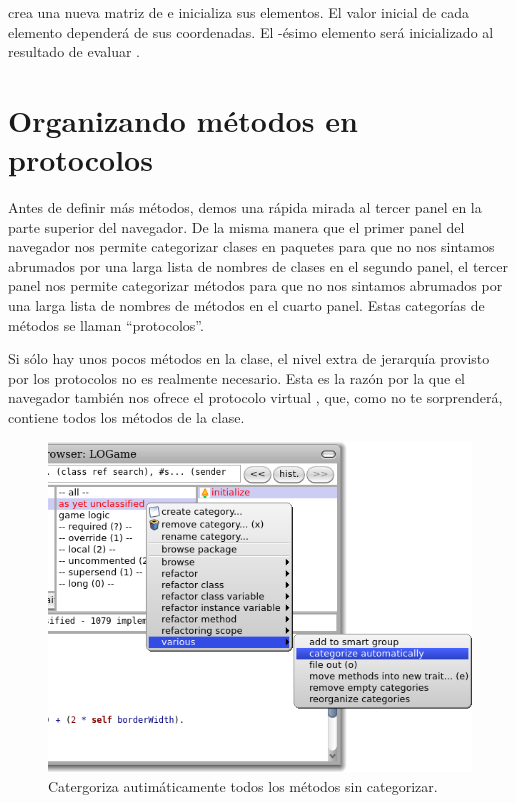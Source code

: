 \documentclass[a4paper,10pt,twoside]{book}
\begin{document}

 crea una nueva matriz de  e inicializa sus elementos. El valor inicial de cada elemento depender\'a de sus coordenadas.  El -\'esimo elemento ser\'a inicializado al resultado de evaluar .


\section{Organizando m\'etodos en protocolos}

Antes de definir m\'as m\'etodos, demos una r\'apida mirada al tercer panel en la parte superior del navegador. 
De la misma manera que el primer panel del navegador nos permite categorizar clases en paquetes para que no nos sintamos abrumados por una larga lista de nombres de clases en el segundo panel, el tercer panel nos permite categorizar m\'etodos para que no nos sintamos abrumados por una larga lista de nombres de m\'etodos en el cuarto panel.
Estas categor\'ias de m\'etodos se llaman ``protocolos''.

Si s\'olo hay unos pocos m\'etodos en la clase, el nivel extra de jerarqu\'ia provisto por los protocolos no es realmente necesario.
Esta es la raz\'on por la que el navegador tambi\'en nos ofrece el protocolo virtual , que, como no te sorprender\'a, contiene todos los m\'etodos de la clase.

\begin{figure}[htbp]
   \centering
   \includegraphics[width=\textwidth]{Categorize} 
   \caption{Catergoriza autim\'aticamente todos los m\'etodos sin categorizar.}
\end{figure}
\end{document}

